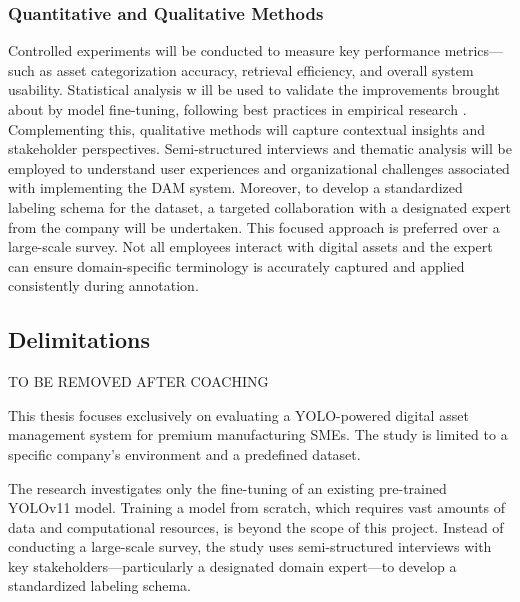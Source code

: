 \documentclass[a4paper,10pt,twocolumn]{article}
\numberwithin{figure}{section}
\numberwithin{table}{section}
\begin{document}
\vspace{0.3cm}
\subsubsection{Quantitative and Qualitative Methods }
\vspace{0.3cm}
Controlled experiments will be conducted to measure key performance 
metrics—such as asset categorization accuracy, retrieval efficiency, 
and overall system usability. Statistical analysis w
ill be used to validate the improvements brought about by model fine-tuning, 
following best practices in empirical research \citep{creswell2014, yin2014case}.
Complementing this, qualitative methods will capture contextual insights and 
stakeholder perspectives. Semi-structured interviews and thematic analysis 
will be employed to understand user experiences and organizational challenges 
associated with implementing the DAM system. 
Moreover, to develop a standardized 
labeling schema for the dataset, a targeted collaboration with a designated 
expert from the company will be undertaken. This focused approach is 
preferred over a large-scale survey. Not all employees interact 
with digital assets and the expert can ensure domain-specific 
terminology is accurately captured and applied consistently during annotation.

\subsection{Delimitations}
TO BE REMOVED AFTER COACHING

This thesis focuses exclusively on evaluating a YOLO-powered digital asset management 
system for premium manufacturing SMEs. The study is limited to a specific company’s 
environment and a predefined dataset.

The research investigates only the fine-tuning of an existing pre-trained YOLOv11 model. 
Training a model from scratch, which requires vast amounts of data and computational resources, 
is beyond the scope of this project.
Instead of conducting a large-scale survey, the study uses semi-structured interviews with key 
stakeholders—particularly a designated domain expert—to develop a standardized labeling schema. 
\end{document}
